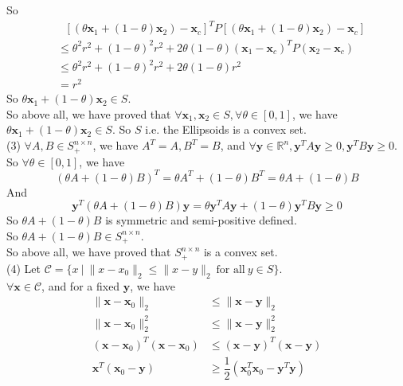 \documentclass[10pt]{article}
\renewcommand{\mathbf}{\boldsymbol}
\begin{document}
\begin{enumerate}
So 
\begin{align*}
    &\ \ \  [(\theta\mathbf{x}_1+(1-\theta)\mathbf{x}_2)-\mathbf{x}_c]^TP[(\theta\mathbf{x}_1+(1-\theta)\mathbf{x}_2)-\mathbf{x}_c] \\
    &\leq \theta^2r^2+(1-\theta)^2r^2+2\theta(1-\theta)(\mathbf{x}_1-\mathbf{x}_c)^TP(\mathbf{x}_2-\mathbf{x}_c)\\
    &\leq \theta^2r^2+(1-\theta)^2r^2+2\theta(1-\theta)r^2\\
    &= r^2
\end{align*}
So $\theta\mathbf{x}_1+(1-\theta)\mathbf{x}_2\in S$.\\

So above all, we have proved that $\forall\mathbf{x}_1,\mathbf{x}_2\in S, \forall\theta\in [0,1]$, we have $\theta\mathbf{x}_1+(1-\theta)\mathbf{x}_2\in S$. So $S$ i.e. the Ellipsoids is a convex set.\\


(3) $\forall A,B\in S_+^{n\times n}$, we have $A^T=A,B^T=B$, and $\forall \mathbf{y}\in\mathbb{R}^n, \mathbf{y}^TA\mathbf{y}\geq 0, \mathbf{y}^TB\mathbf{y}\geq 0$.\\
So $\forall\theta\in[0,1]$, we have $$(\theta A+(1-\theta)B)^T=\theta A^T+(1-\theta)B^T=\theta A+(1-\theta)B$$
And $$\mathbf{y}^T(\theta A+(1-\theta)B)\mathbf{y}=\theta\mathbf{y}^TA\mathbf{y}+(1-\theta)\mathbf{y}^TB\mathbf{y}\geq 0$$
So $\theta A+(1-\theta)B$ is symmetric and semi-positive defined.\\
So $\theta A+(1-\theta)B\in S_+^{n\times n}$.\\

So above all, we have proved that $S_+^{n\times n}$ is a convex set.\\

(4) Let $\mathcal{C}=\Big\{x~\vert~\|x-x_0\|_2\leq\|x-y\|_2~\text{for all}~y\in S\Big\}$.\\
$\forall\mathbf{x}\in\mathcal{C}$, and for a fixed $\mathbf{y}$, we have
\begin{align*}
    \|\mathbf{x}-\mathbf{x}_0\|_2 &\leq \|\mathbf{x}-\mathbf{y}\|_2 \\
    \|\mathbf{x}-\mathbf{x}_0\|_2^2 &\leq \|\mathbf{x}-\mathbf{y}\|_2^2 \\
    (\mathbf{x}-\mathbf{x}_0)^T(\mathbf{x}-\mathbf{x}_0) &\leq (\mathbf{x}-\mathbf{y})^T(\mathbf{x}-\mathbf{y})\\
    \mathbf{x}^T(\mathbf{x}_0-\mathbf{y}) &\geq \dfrac{1}{2}(\mathbf{x}_0^T\mathbf{x}_0-\mathbf{y}^T\mathbf{y})
\end{align*}


\end{enumerate}
\end{document}
